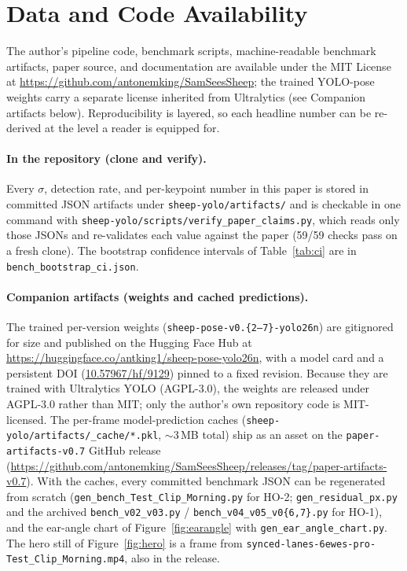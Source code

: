 \documentclass[11pt]{article}
\begin{document}
\section*{Data and Code Availability}
The author's pipeline code, benchmark scripts, machine-readable benchmark
artifacts, paper source, and documentation are available under the MIT License at
\url{https://github.com/antonemking/SamSeesSheep}; the trained YOLO-pose weights
carry a separate license inherited from Ultralytics (see Companion artifacts
below). Reproducibility is layered, so
each headline number can be re-derived at the level a reader is equipped for.

\paragraph{In the repository (clone and verify).} Every $\sigma$, detection rate,
and per-keypoint number in this paper is stored in committed JSON artifacts under
\texttt{sheep-yolo/artifacts/} and is checkable in one command with
\texttt{sheep-yolo/scripts/verify\_paper\_claims.py}, which reads only those JSONs
and re-validates each value against the paper (59/59 checks pass on a fresh
clone). The bootstrap confidence intervals of Table~\ref{tab:ci} are in
\texttt{bench\_bootstrap\_ci.json}.

\paragraph{Companion artifacts (weights and cached predictions).} The trained
per-version weights (\texttt{sheep-pose-v0.\{2--7\}-yolo26n}) are gitignored for
size and published on the Hugging Face Hub at
\url{https://huggingface.co/antking1/sheep-pose-yolo26n}, with a
model card and a persistent DOI (\href{https://doi.org/10.57967/hf/9129}{10.57967/hf/9129})
pinned to a fixed revision. Because they are trained with Ultralytics YOLO
(AGPL-3.0), the weights are released under AGPL-3.0 rather than MIT; only the
author's own repository code is MIT-licensed. The per-frame model-prediction caches
(\texttt{sheep-yolo/artifacts/\_cache/*.pkl}, ${\sim}3$\,MB total) ship as an asset
on the \texttt{paper-artifacts-v0.7} GitHub release
(\url{https://github.com/antonemking/SamSeesSheep/releases/tag/paper-artifacts-v0.7}).
With the caches, every
committed benchmark JSON can be regenerated from scratch
(\texttt{gen\_bench\_Test\_Clip\_Morning.py} for HO-2; \texttt{gen\_residual\_px.py}
and the archived \texttt{bench\_v02\_v03.py} /
\texttt{bench\_v04\_v05\_v0\{6,7\}.py} for HO-1), and the ear-angle chart of
Figure~\ref{fig:earangle} with \texttt{gen\_ear\_angle\_chart.py}. The hero still
of Figure~\ref{fig:hero} is a frame from
\texttt{synced-lanes-6ewes-pro-Test\_Clip\_Morning.mp4}, also in the release.
\end{document}
